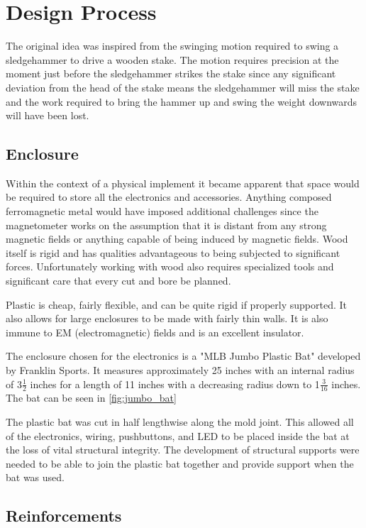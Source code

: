 \chapter{Design Process}

The original idea was inspired from the swinging motion required to swing a sledgehammer to drive a wooden stake.  The motion requires precision at the moment just before the sledgehammer strikes the stake since any significant deviation from the head of the stake means the sledgehammer will miss the stake and the work required to bring the hammer up and swing the weight downwards will have been lost.

\section{Enclosure}

Within the context of a physical implement it became apparent that space would be required to store all the electronics and accessories.  Anything composed ferromagnetic metal would have imposed additional challenges since the magnetometer works on the assumption that it is distant from any strong magnetic fields or anything capable of being induced by magnetic fields.  Wood itself is rigid and has qualities advantageous to being subjected to significant forces. Unfortunately working with wood also requires specialized tools and significant care that every cut and bore be planned.

Plastic is cheap, fairly flexible, and can be quite rigid if properly supported.  It also allows for large enclosures to be made with fairly thin walls.  It is also immune to EM (electromagnetic) fields and is an excellent insulator.

The enclosure chosen for the electronics is a "MLB Jumbo Plastic Bat" developed by Franklin Sports.  It measures approximately 25 inches with an internal radius of 3\(\frac{1}{2}\) inches for a length of 11 inches with a decreasing radius down to 1\(\frac{3}{16}\) inches.  The bat can be seen in \autoref{fig:jumbo_bat}

The plastic bat was cut in half lengthwise along the mold joint.  This allowed all of the electronics, wiring, pushbuttons, and LED to be placed inside the bat at the loss of vital structural integrity. The development of structural supports were needed to be able to join the plastic bat together and provide support when the bat was used.

\section{Reinforcements}

